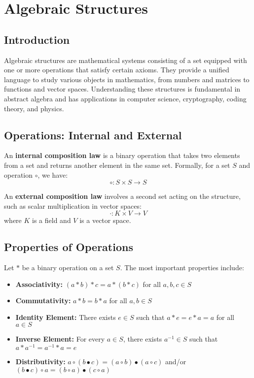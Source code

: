 \section{Algebraic Structures}

\subsection{Introduction}

Algebraic structures are mathematical systems consisting of a set equipped with one or more operations that satisfy certain axioms. They provide a unified language to study various objects in mathematics, from numbers and matrices to functions and vector spaces. Understanding these structures is fundamental in abstract algebra and has applications in computer science, cryptography, coding theory, and physics.

\subsection{Operations: Internal and External}

An \textbf{internal composition law} is a binary operation that takes two elements from a set and returns another element in the same set. Formally, for a set $S$ and operation $\circ$, we have:
\[
\circ: S \times S \rightarrow S
\]

An \textbf{external composition law} involves a second set acting on the structure, such as scalar multiplication in vector spaces:
\[
\cdot: K \times V \rightarrow V
\]
where $K$ is a field and $V$ is a vector space.

\subsection{Properties of Operations}

Let $\ast$ be a binary operation on a set $S$. The most important properties include:

\begin{itemize}
    \item \textbf{Associativity:} $(a \ast b) \ast c = a \ast (b \ast c)$ for all $a,b,c \in S$
    \item \textbf{Commutativity:} $a \ast b = b \ast a$ for all $a,b \in S$
    \item \textbf{Identity Element:} There exists $e \in S$ such that $a \ast e = e \ast a = a$ for all $a \in S$
    \item \textbf{Inverse Element:} For every $a \in S$, there exists $a^{-1} \in S$ such that $a \ast a^{-1} = a^{-1} \ast a = e$
    \item \textbf{Distributivity:} $a \circ (b \bullet c) = (a \circ b) \bullet (a \circ c)$ and/or $(b \bullet c) \circ a = (b \circ a) \bullet (c \circ a)$
\end{itemize}

